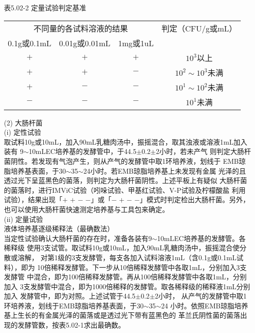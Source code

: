 \documentclass[11pt,a4paper]{article}
\newenvironment{SC}{%
  \CJKfamily{gbsn}%
  \CJKtilde
  \CJKnospace}{}
\begin{document}
\begin{CJK}{UTF8}{}
\begin{SC}
\begin{table}[htb]
\begin{center}
表5.02-2 定量试验判定基准\\
\begin{tabular}{ccc|c}
\hline
\multicolumn{3}{c|}{不同量的各试料溶液的结果}&判定（CFU/g或mL）\\
\cline{1-3}
0.1g或0.1mL&0.01g或0.01mL&1mg或1uL\\
\hline
$+$&$+$&$+$&$10^3$以上\\
\hline
$+$&$+$&$-$&$10^2\sim10^3$未满\\
\hline
$+$&$-$&$-$&$10^1\sim10^2$未满\\
\hline
$-$&$-$&$-$&$10^1$未满\\
\hline
\end{tabular}
\end{center}
\end{table}

(2) 大肠杆菌\\

(i) 定性试验\\
取试料10g或10mL，加入90mL乳糖肉汤中，振摇混合，取其浊液或溶液1mL加入装有
9$\sim$10mLEC培养基的发酵管中，于44.5$\pm$0.2$\pm$2小时，若未产气
则判定大肠杆菌阴性。若发现有气泡产生，则从产气的发酵管中取1环培养液，划线于
EMB琼脂培养基表面，于30$\sim$35$\sim$24小时。若EMB琼脂培养基上未发现有金属
光泽的且透过光下呈蓝黑色的菌落，则判定为大肠杆菌阴性。上述平板上有疑似
大肠杆菌的菌落时，进行IMViC试验（吲哚试验、甲基红试验、V-P试验及柠檬酸盐
利用试验），结果出现「$+$ $+$ $-$ $-$」或「$-$ $+$ $-$ $-$」模式时判定检出大肠杆菌。另外，
也可以使用大肠杆菌快速测定培养基与工具包来确定。\\

(ii) 定量试验\\
液体培养基逐级稀释法（最确数法）\\
当定性试验确认大肠杆菌的存在时，准备各装有9$\sim$10mLEC培养基的发酵管。各稀释级
使用3支试管。取试料10g或10mL，加入90mL乳糖肉汤中，振摇混合使分散或溶解，
对第1级的3支发酵管，每支各加入试料溶液1mL（含0.1g或0.1mL试料），即为
10倍稀释发酵管。下一步从10倍稀释发酵管中各取1mL，分别加入3支发酵管
中混合，即为100倍稀释发酵管。再从100倍稀释发酵管中各取1mL，分别加入
3支发酵管中混合，即为1000倍稀释的发酵管。取各稀释级的稀释液1mL分别加入
发酵管中，即为对照。上述试管于44.5$\pm$0.2$\pm$2小时，
从产气的发酵管中取1环培养液，划线于EMB琼脂培养基表面，于30$\sim$35$\sim$24
小时。依照EMB琼脂培养基上生长的有金属光泽的菌落或是透过光下带有蓝黑色的
革兰氏阴性菌的菌落出现的发酵管数，按表5.02-1求出最确数。\\


\end{SC}
\end{CJK}
\end{document}
